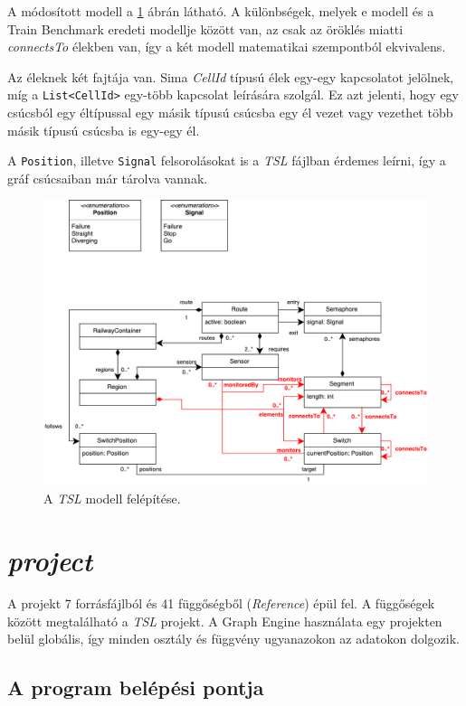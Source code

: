 A módosított modell a \ref{fig:GraphEngineTSLModel} ábrán látható. A különbségek, melyek e modell és a Train Benchmark eredeti modellje között van, az csak az öröklés miatti \emph{connectsTo} élekben van, így a két modell matematikai szempontból ekvivalens.

Az éleknek két fajtája van. Sima \emph{CellId} típusú élek egy-egy kapcsolatot jelölnek, míg a \texttt{List<CellId>} egy-több kapcsolat leírására szolgál. Ez azt jelenti, hogy egy csúcsból egy éltípussal egy másik típusú csúcsba egy él vezet vagy vezethet több másik típusú csúcsba is egy-egy él.

A \texttt{Position}, illetve \texttt{Signal} felsorolásokat is a \emph{TSL} fájlban érdemes leírni, így a gráf csúcsaiban már tárolva vannak.

\begin{figure}[H]
	\centering
	\includegraphics[width=\linewidth, keepaspectratio]{figures/GraphEngineTSLModel.pdf}
	\caption{A \emph{TSL} modell felépítése.}
	\label{fig:GraphEngineTSLModel}
\end{figure}

\section{\emph{\Csh{} project}}

A projekt 7 forrásfájlból és 41 függőségből (\emph{Reference}) épül fel. A függőségek között megtalálható a \emph{TSL} projekt. A Graph Engine használata egy projekten belül globális, így minden osztály és függvény ugyanazokon az adatokon dolgozik.

\subsection{A program belépési pontja}

